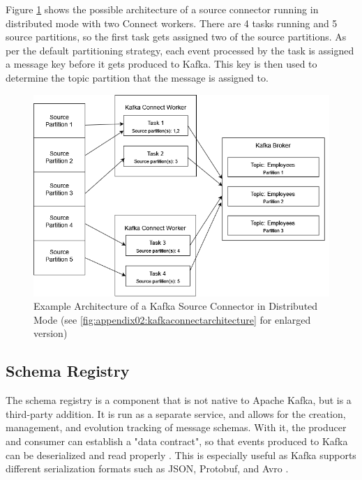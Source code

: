 Figure \ref{fig:fundamentals:kafkaconnectarchitecture} shows the possible architecture of a source connector running in distributed mode with two Connect workers. There are 4 tasks running and 5 source partitions, so the first task gets assigned two of the source partitions. As per the default partitioning strategy, each event processed by the task is assigned a message key before it gets produced to Kafka. This key is then used to determine the topic partition that the message is assigned to.

\begin{figure}[htbp]
 \centering
 \includegraphics[width=1\textwidth]{chapters/images/kafka connect architecture enlarged.drawio.png}
 \caption[Example Architecture of a Kafka Source Connector in Distributed Mode]{Example Architecture of a Kafka Source Connector in Distributed Mode (see \ref{fig:appendix02:kafkaconnectarchitecture} for enlarged version)}
 \label{fig:fundamentals:kafkaconnectarchitecture}
\end{figure}


\subsection{Schema Registry}
The schema registry is a component that is not native to Apache Kafka, but is a third-party addition. It is run as a separate service, and allows for the creation, management, and evolution tracking of message schemas. With it, the producer and consumer can establish a "data contract", so that events produced to Kafka can be deserialized and read properly \cite{kreps2011kafka}. This is especially useful as Kafka supports different serialization formats such as JSON, Protobuf, and Avro \cite{kafkadocumentation}.

